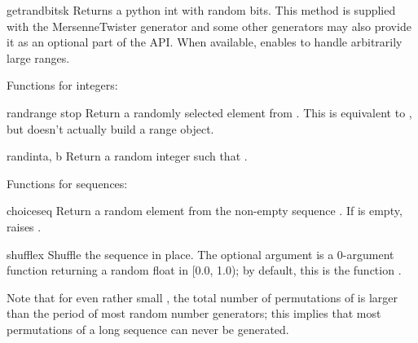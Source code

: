 \begin{funcdesc}{getrandbits}{k}
  Returns a python  int with  random bits.
  This method is supplied with the MersenneTwister generator and some
  other generators may also provide it as an optional part of the API.
  When available,  enables 
  to handle arbitrarily large ranges.
\end{funcdesc}

Functions for integers:

\begin{funcdesc}{randrange}{ stop}
  Return a randomly selected element from .  This is equivalent to
  ,
  but doesn't actually build a range object.
\end{funcdesc}

\begin{funcdesc}{randint}{a, b}
  Return a random integer  such that
  .
\end{funcdesc}


Functions for sequences:

\begin{funcdesc}{choice}{seq}
  Return a random element from the non-empty sequence .
  If  is empty, raises .
\end{funcdesc}

\begin{funcdesc}{shuffle}{x}
  Shuffle the sequence  in place.
  The optional argument  is a 0-argument function
  returning a random float in [0.0, 1.0); by default, this is the
  function .

  Note that for even rather small , the total
  number of permutations of  is larger than the period of most
  random number generators; this implies that most permutations of a
  long sequence can never be generated.
\end{funcdesc}

